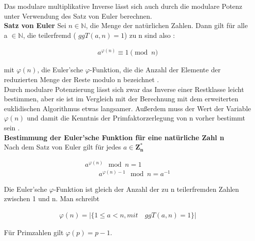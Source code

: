 Das modulare multiplikative Inverse lässt sich auch durch die modulare Potenz unter Verwendung des Satz von Euler berechnen. \\
\textbf{Satz von Euler}
Sei \(n \in \mathbb{N}\), die Menge der natürlichen Zahlen. Dann gilt
für alle a \(\in \mathbb{N}\), die teilerfremd ( $ ggT(a, n) = 1 $) zu n sind also \cite{langMIE}: \\

\begin{ceqn}
\begin{align*}
            a^{\varphi(n)} \equiv 1 \pmod n
\end{align*}
\end{ceqn}
mit $ \varphi(n)$, die Euler’sche $\varphi$-Funktion, die die Anzahl der Elemente der
reduzierten Menge der Reste modulo n bezeichnet \cite{damer}. \\

Durch modulare Potenzierung lässt sich zwar das Inverse einer Restklasse
leicht bestimmen, aber sie ist im Vergleich mit der Berechnung mit dem
erweiterten euklidischen Algorithmus etwas langsamer. Außerdem muss der Wert der Variable \(\varphi(n)\) und damit die Kenntnis der Primfaktorzerlegung von n vorher bestimmt sein \cite{langMIE}.
\\

\textbf{Bestimmung der Euler'sche Funktion für eine natürliche Zahl n } \\

Nach dem Satz von Euler gilt für jedes \(a \in \mathbf{Z^*_n} \)\\

\begin{ceqn}
\begin{align*}
            a^{\varphi(n)} \mod n = 1 \\
    \qquad  a^{\varphi(n) - 1} \mod n = a^{-1}
\end{align*}
\end{ceqn}

Die Euler'sche $\varphi$-Funktion ist gleich der Anzahl der zu n
teilerfremden Zahlen zwischen 1 und n. Man schreibt \\

\begin{ceqn}
\begin{align*}
         \varphi(n) = |\{ 1 \leq a < n, mit \quad ggT(a, n) = 1 \}|
\end{align*}
\end{ceqn}

Für Primzahlen gilt \(\varphi(p) = p - 1 \). \\

